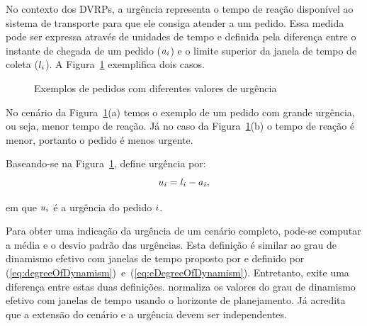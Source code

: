 No contexto dos DVRPs, a urgência representa o tempo de reação disponível ao 
sistema de transporte para que ele consiga atender a um pedido.
Essa medida pode ser expressa através de unidades de tempo e definida pela 
diferença entre o instante de chegada de um pedido ($a_i$) 
e o limite superior da janela de tempo de coleta 
($l_i$).
A Figura~\ref{fig:van_lon_measures_2016_urgency} exemplifica dois casos.

\begin{figure}[H]
    \begin{center}
        \caption{Exemplos de pedidos com diferentes valores de urgência 
                 \cite{van_lon_measures_2016}}
        \label{fig:van_lon_measures_2016_urgency}
    \end{center} 
\end{figure}

No cenário da Figura~\ref{fig:van_lon_measures_2016_urgency}(a) temos o exemplo
de um pedido com grande urgência, ou seja, menor tempo de reação.
Já no caso da Figura~\ref{fig:van_lon_measures_2016_urgency}(b) o tempo de 
reação é menor, portanto o pedido é menos urgente.

Baseando-se na Figura~\ref{fig:van_lon_measures_2016_urgency}, 
 define urgência por:
%
\begin{equation}
    u_i = l_i - a_i,
    \label{eq:van_lon_measures_2016_urgency}
\end{equation}

\noindent em que $u_i$ é a urgência do pedido $i$.

Para obter uma indicação da urgência de um cenário completo, pode-se computar a
média e o desvio padrão das urgências. 
Esta definição é similar ao grau de dinamismo efetivo com janelas de tempo 
proposto por  e definido por
(\ref{eq:degreeOfDynamism})~e~(\ref{eq:eDegreeOfDynamism}).
Entretanto, exite uma diferença entre estas duas definições.
 normaliza os valores do grau de dinamismo
efetivo com janelas de tempo usando o horizonte de planejamento.  
Já  acredita que a extensão do cenário e
a urgência devem ser independentes.


